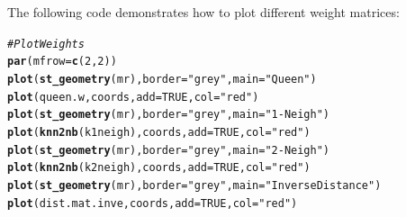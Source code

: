 \documentclass[english,12pt]{book}\usepackage[]{graphicx}\usepackage[]{xcolor}
\makeatletter
\newcommand{\hlnum}[1]{\textcolor[rgb]{0.686,0.059,0.569}{#1}}%
\newcommand{\hlsng}[1]{\textcolor[rgb]{0.192,0.494,0.8}{#1}}%
\newcommand{\hlcom}[1]{\textcolor[rgb]{0.678,0.584,0.686}{\textit{#1}}}%
\newcommand{\hldef}[1]{\textcolor[rgb]{0.345,0.345,0.345}{#1}}%
\newcommand{\hlkwc}[1]{\textcolor[rgb]{0.333,0.667,0.333}{#1}}%
\newcommand{\hlkwd}[1]{\textcolor[rgb]{0.737,0.353,0.396}{\textbf{#1}}}%
\newenvironment{kframe}{%
 \def\at@end@of@kframe{}%
 \ifinner\ifhmode%
  \def\at@end@of@kframe{\end{minipage}}%
  \begin{minipage}{\columnwidth}%
 \fi\fi%
 \def\FrameCommand##1{\hskip\@totalleftmargin \hskip-\fboxsep
 \colorbox{shadecolor}{##1}\hskip-\fboxsep
     \hskip-\linewidth \hskip-\@totalleftmargin \hskip\columnwidth}%
 \MakeFramed {\advance\hsize-\width
   \@totalleftmargin\z@ \linewidth\hsize
   \@setminipage}}%
 {\par\unskip\endMakeFramed%
 \at@end@of@kframe}
\newenvironment{knitrout}{}{} %
\makeatother
\begin{document}
The following code demonstrates how to plot different weight matrices:

\begin{knitrout}
\color{fgcolor}\begin{kframe}
\begin{alltt}
\hlcom{# Plot Weights}
\hlkwd{par}\hldef{(}\hlkwc{mfrow} \hldef{=} \hlkwd{c}\hldef{(}\hlnum{2}\hldef{,} \hlnum{2}\hldef{))}
\hlkwd{plot}\hldef{(}\hlkwd{st_geometry}\hldef{(mr),} \hlkwc{border} \hldef{=} \hlsng{"grey"}\hldef{,} \hlkwc{main} \hldef{=} \hlsng{"Queen"}\hldef{)}
\hlkwd{plot}\hldef{(queen.w, coords,} \hlkwc{add} \hldef{=}  \hlnum{TRUE}\hldef{,} \hlkwc{col} \hldef{=} \hlsng{"red"}\hldef{)}
\hlkwd{plot}\hldef{(}\hlkwd{st_geometry}\hldef{(mr),} \hlkwc{border} \hldef{=} \hlsng{"grey"}\hldef{,} \hlkwc{main} \hldef{=} \hlsng{"1-Neigh"}\hldef{)}
\hlkwd{plot}\hldef{(}\hlkwd{knn2nb}\hldef{(k1neigh), coords,} \hlkwc{add} \hldef{=} \hlnum{TRUE}\hldef{,} \hlkwc{col} \hldef{=} \hlsng{"red"}\hldef{)}
\hlkwd{plot}\hldef{(}\hlkwd{st_geometry}\hldef{(mr),} \hlkwc{border} \hldef{=} \hlsng{"grey"}\hldef{,} \hlkwc{main} \hldef{=} \hlsng{"2-Neigh"}\hldef{)}
\hlkwd{plot}\hldef{(}\hlkwd{knn2nb}\hldef{(k2neigh), coords,} \hlkwc{add} \hldef{=} \hlnum{TRUE}\hldef{,} \hlkwc{col} \hldef{=} \hlsng{"red"}\hldef{)}
\hlkwd{plot}\hldef{(}\hlkwd{st_geometry}\hldef{(mr),} \hlkwc{border} \hldef{=} \hlsng{"grey"}\hldef{,} \hlkwc{main} \hldef{=} \hlsng{"Inverse Distance"}\hldef{)}
\hlkwd{plot}\hldef{(dist.mat.inve, coords,} \hlkwc{add} \hldef{=}  \hlnum{TRUE}\hldef{,} \hlkwc{col} \hldef{=} \hlsng{"red"}\hldef{)}
\end{alltt}
\end{kframe}
\end{knitrout}
\end{document}

